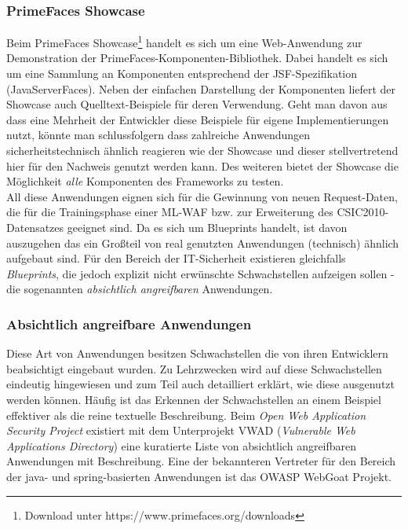 \subsubsection{PrimeFaces Showcase}

Beim PrimeFaces Showcase\footnote{Download unter https://www.primefaces.org/downloads} handelt es sich um eine Web-Anwendung zur Demonstration der PrimeFaces-Komponenten-Bibliothek. Dabei handelt es sich um eine Sammlung an Komponenten entsprechend der JSF-Spezifikation (JavaServerFaces). Neben der einfachen Darstellung der Komponenten liefert der Showcase auch Quelltext-Beispiele für deren Verwendung. Geht man davon aus dass eine Mehrheit der Entwickler diese Beispiele für eigene Implementierungen nutzt, könnte man schlussfolgern dass zahlreiche Anwendungen sicherheitstechnisch ähnlich reagieren wie der Showcase und dieser stellvertretend hier für den Nachweis genutzt werden kann. Des weiteren bietet der Showcase die Möglichkeit \emph{alle} Komponenten des Frameworks zu testen.\\

All diese Anwendungen eignen sich für die Gewinnung von neuen Request-Daten, die für die Trainingsphase einer ML-WAF bzw. zur Erweiterung des CSIC2010-Datensatzes geeignet sind. Da es sich um Blueprints handelt, ist davon auszugehen das ein Großteil von real genutzten Anwendungen (technisch) ähnlich aufgebaut sind. Für den Bereich der IT-Sicherheit existieren gleichfalls \emph{Blueprints}, die jedoch explizit nicht erwünschte Schwachstellen aufzeigen sollen - die sogenannten \emph{absichtlich angreifbaren} Anwendungen. 

\subsubsection{Absichtlich angreifbare Anwendungen}
Diese Art von Anwendungen besitzen Schwachstellen die von ihren Entwicklern beabsichtigt eingebaut wurden. Zu Lehrzwecken wird auf diese Schwachstellen eindeutig hingewiesen und zum Teil auch detailliert erklärt, wie diese ausgenutzt werden können. Häufig ist das Erkennen der Schwachstellen an einem Beispiel effektiver als die reine textuelle Beschreibung. Beim \emph{Open Web Application Security Project} existiert mit dem Unterprojekt VWAD (\emph{Vulnerable Web Applications Directory}) eine kuratierte Liste von absichtlich angreifbaren Anwendungen mit Beschreibung. Eine der bekannteren Vertreter für den Bereich der java- und spring-basierten Anwendungen ist das OWASP WebGoat Projekt.

